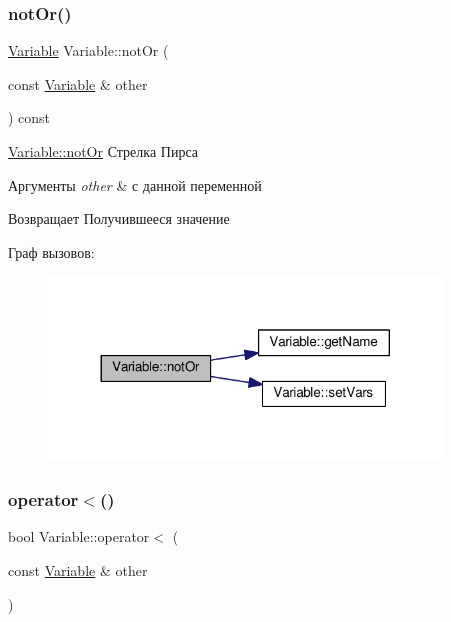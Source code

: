 \subsubsection{\texorpdfstring{not\+Or()}{notOr()}}
{\footnotesize\ttfamily \hyperlink{class_variable}{Variable} Variable\+::not\+Or (\begin{DoxyParamCaption}\item[{const \hyperlink{class_variable}{Variable} \&}]{other }\end{DoxyParamCaption}) const}



\hyperlink{class_variable_aa71e11142a257fa6676257843879148c}{Variable\+::not\+Or} Стрелка Пирса 


\begin{DoxyParams}{Аргументы}
{\em other} & с данной переменной \\
\hline
\end{DoxyParams}
\begin{DoxyReturn}{Возвращает}
Получившееся значение 
\end{DoxyReturn}
Граф вызовов\+:\nopagebreak
\begin{figure}[H]
\begin{center}
\leavevmode
\includegraphics[width=296pt]{class_variable_aa71e11142a257fa6676257843879148c_cgraph}
\end{center}
\end{figure}
\mbox{\label{class_variable_ac0aa608ee2a38525351a6a5d902a466f}} 
\subsubsection{\texorpdfstring{operator$<$()}{operator<()}}
{\footnotesize\ttfamily bool Variable\+::operator$<$ (\begin{DoxyParamCaption}\item[{const \hyperlink{class_variable}{Variable} \&}]{other }\end{DoxyParamCaption})}



